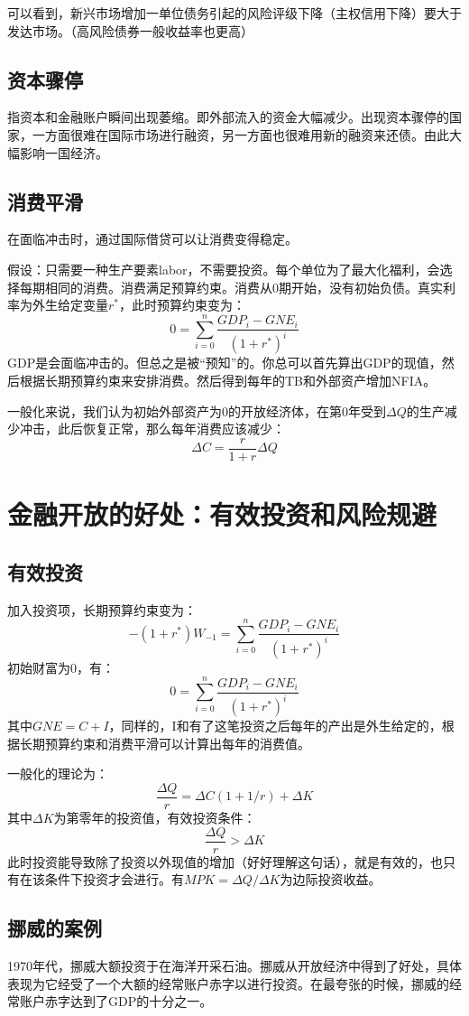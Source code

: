 \documentclass[a4paper, 10pt]{article}
\begin{document}
\noindent 可以看到，新兴市场增加一单位债务引起的风险评级下降（主权信用下降）要大于发达市场。（高风险债券一般收益率也更高）

\subsection{资本骤停}
\noindent 指资本和金融账户瞬间出现萎缩。即外部流入的资金大幅减少。出现资本骤停的国家，一方面很难在国际市场进行融资，另一方面也很难用新的融资来还债。由此大幅影响一国经济。

\subsection{消费平滑}
\noindent 在面临冲击时，通过国际借贷可以让消费变得稳定。

\noindent 假设：只需要一种生产要素labor，不需要投资。每个单位为了最大化福利，会选择每期相同的消费。消费满足预算约束。消费从0期开始，没有初始负债。真实利率为外生给定变量$r^*$，此时预算约束变为：
$$0=\sum_{i=0}^n\frac{GDP_i-GNE_i}{(1+r^*)^i}$$
\noindent GDP是会面临冲击的。但总之是被“预知”的。你总可以首先算出GDP的现值，然后根据长期预算约束来安排消费。然后得到每年的TB和外部资产增加NFIA。

\noindent 一般化来说，我们认为初始外部资产为0的开放经济体，在第0年受到$\Delta Q$的生产减少冲击，此后恢复正常，那么每年消费应该减少：
$$\Delta C=\frac{r}{1+r}\Delta Q$$

\section{金融开放的好处：有效投资和风险规避}
\subsection{有效投资}
\noindent 加入投资项，长期预算约束变为：
$$-(1+r^*)W_{-1}=\sum_{i=0}^n\frac{GDP_i-GNE_i}{(1+r^*)^i}$$
初始财富为0，有：
$$0=\sum_{i=0}^n\frac{GDP_i-GNE_i}{(1+r^*)^i}$$
其中$GNE=C+I$，同样的，I和有了这笔投资之后每年的产出是外生给定的，根据长期预算约束和消费平滑可以计算出每年的消费值。

\noindent 一般化的理论为：
$$\frac{\Delta Q}{r}=\Delta C(1+1/r)+\Delta K$$
其中$\Delta K$为第零年的投资值，有效投资条件：
$$\frac{\Delta Q}{r}>\Delta K$$
此时投资能导致除了投资以外现值的增加（好好理解这句话），就是有效的，也只有在该条件下投资才会进行。有$MPK=\Delta Q/\Delta K$为边际投资收益。
\subsection{挪威的案例}
\noindent 1970年代，挪威大额投资于在海洋开采石油。挪威从开放经济中得到了好处，具体表现为它经受了一个大额的经常账户赤字以进行投资。在最夸张的时候，挪威的经常账户赤字达到了GDP的十分之一。
\end{document}
